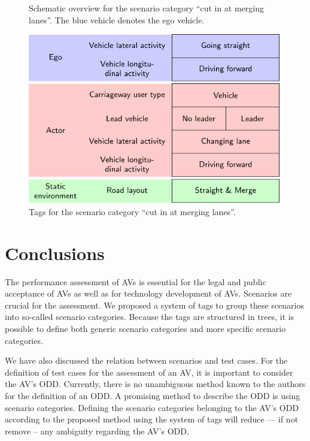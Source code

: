 \documentclass[twoside,twocolumn,9pt]{extarticle}
\newlength\figurewidth
\theoremstyle{plain}
\begin{document}
\setlength{\figurewidth}{22.5em}
\begin{figure}
	\centering
	
	\caption{Schematic overview for the scenario category ``cut in at merging lanes''. The blue vehicle denotes the ego vehicle.}
	\label{fig:scheme cut in}		
\end{figure}
\begin{figure}
	\centering
	\includegraphics[width=\linewidth]{cut-in_tags}
	\caption{Tags for the scenario category ``cut in at merging lanes''.}
	\label{fig:tags cut in}
\end{figure}





\section{Conclusions}
\label{sec:conclusions}

The performance assessment of AVs is essential for the legal and public acceptance of AVs as well as for technology development of AVs. 
Scenarios are crucial for the assessment. We proposed a system of tags to group these scenarios into so-called scenario categories. Because the tags are structured in trees, it is possible to define both generic scenario categories and more specific scenario categories.

We have also discussed the relation between scenarios and test cases. For the definition of test cases for the assessment of an AV, it is important to consider the AV's ODD. Currently, there is no unambiguous method known to the authors for the definition of an ODD. A promising method to describe the ODD is using scenario categories. Defining the scenario categories belonging to the AV's ODD according to the proposed method using the system of tags will reduce --- if not remove -- any ambiguity regarding the AV's ODD.
\end{document}
